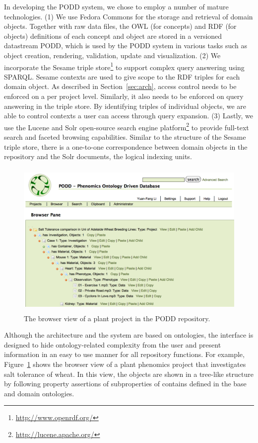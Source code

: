 \documentclass{llncs}
\begin{document}
\vspace{-12pt}
In developing the PODD system, we chose to employ a number of mature
technologies. (1) We use Fedora Commons for the storage and retrieval
of domain objects. Together with raw data files, the OWL (for concepts)
and RDF (for objects) definitions of each concept and object are stored
in a versioned datastream PODD, which is used by the PODD system in
various tasks such as object creation, rendering, validation, update
and visualization. (2) We incorporate
the Sesame triple store\footnote{\url{http://www.openrdf.org/}} to
support complex query answering using SPARQL. Sesame contexts are used
to give scope to the RDF triples for each domain object. As described
in Section~\ref{sec:arch}, access control needs to be enforced on a per
project level. Similarly, it also needs to be enforced on query
answering in the triple store. By identifying triples of individual
objects, we are able to control contexts a user can access through
query expansion. (3) Lastly, we use the Lucene and Solr open-source search
engine platform\footnote{\url{http://lucene.apache.org/}} to provide
full-text search and faceted browsing capabilities. Similar to the
structure of the Sesame triple store, there is a one-to-one
correspondence between domain objects in the repository and the Solr
documents, the logical indexing units.

\vspace{-8pt}
\begin{figure}[htb]
\centering
\includegraphics[trim = 5mm 0mm 5mm 0mm, clip,height=76mm]{browser.png}
\vspace{-8pt} \caption{The browser view of a plant project in the PODD
repository.}\label{fig:browser}
\end{figure}

\vspace{-8pt}
Although the architecture and the system are based on ontologies, the
interface is designed to hide ontology-related complexity from the user
and present information in an easy to use manner for all repository
functions. For example, Figure~\ref{fig:browser} shows the browser view
of a plant phenomics project that investigates salt tolerance of wheat. 
In this view, the objects are shown in a tree-like structure by following
property assertions of subproperties of contains defined in  the base
and domain ontologies.
\end{document}
